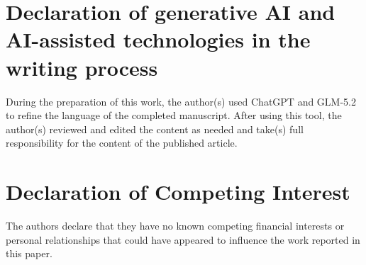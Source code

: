 \documentclass[a4paper,10pt]{cas-sc}%
\newcommand{\rev}[1]{#1}
\begin{document}
%
%
\section*{Declaration of generative AI and AI-assisted technologies in the writing process}
\rev{During the preparation of this work, the author(s) used ChatGPT and GLM-5.2 to refine the language of the completed manuscript. After using this tool, the author(s) reviewed and edited the content as needed and take(s) full responsibility for the content of the published article.}


\section*{Declaration of Competing Interest}
The authors declare that they have no known competing financial interests or personal relationships that could have appeared to influence the work reported in this paper.


% 
% 




\end{document}
